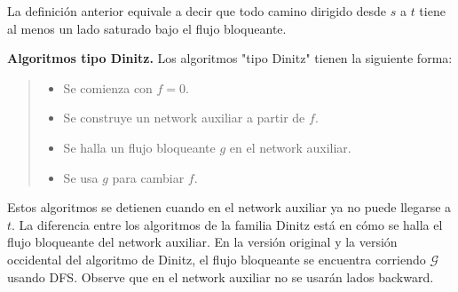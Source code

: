 \documentclass[a4paper]{article}
\begin{document}
La definición anterior equivale a decir que todo camino dirigido desde $s$ a
$t$ tiene al menos un lado saturado bajo el flujo bloqueante.

\textbf{Algoritmos tipo Dinitz.} Los algoritmos "tipo Dinitz" tienen la siguiente forma:

\begin{quote}
\begin{itemize}
    \item Se comienza con $f = 0$.
    \item Se construye un network auxiliar a partir de $f$.
    \item Se halla un flujo bloqueante $g$ en el network auxiliar. 
    \item Se usa $g$ para cambiar $f$.
\end{itemize}
\end{quote}

Estos algoritmos se detienen cuando en el network auxiliar ya no puede llegarse
a $t$. La diferencia entre los algoritmos de la familia Dinitz está en cómo se
halla el flujo bloqueante del network auxiliar. En la versión original y la
versión occidental del algoritmo de Dinitz, el flujo bloqueante se encuentra corriendo 
$\mathscr{G}$ usando DFS. Observe que en el network auxiliar no se usarán lados backward.
\end{document}
